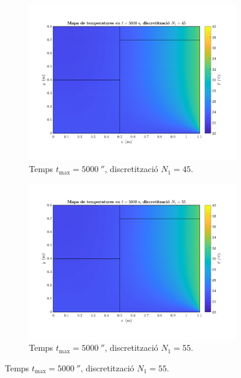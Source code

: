 \begin{figure}[ht]
\begin{subfigure}{.5\textwidth}
		\label{fig:malla_4}
	\end{subfigure}
	\begin{subfigure}{.5\textwidth}
		\centering
		\includegraphics[width=.95\linewidth]{imagenes/04_influencia/malla/malla_5.pdf}
		\vspace{-15pt}
		\caption{Temps $t_\text{max} = 5000 \ \second$, discretització $N_1 = 45$.}
		\label{fig:malla_5}
	\end{subfigure}%
	\begin{subfigure}{.5\textwidth}
		\centering
		\includegraphics[width=.95\linewidth]{imagenes/04_influencia/malla/malla_6.pdf}
		\vspace{-15pt}
		\caption{Temps $t_\text{max} = 5000 \ \second$, discretització $N_1 = 55$.}
		\label{Temps fig:malla_6}
	\end{subfigure}

\end{figure}
